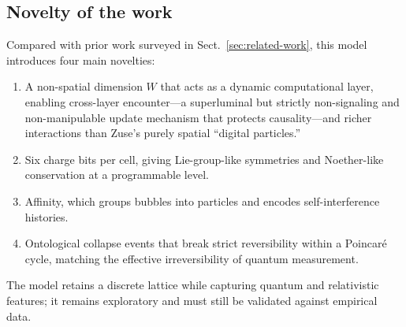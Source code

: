 \documentclass[a4paper]{article}
\begin{document}
\subsection{Novelty of the work}
Compared with prior work surveyed in Sect.~\ref{sec:related-work}, this model introduces four main novelties:
\begin{enumerate}
\item A non-spatial dimension $W$ that acts as a dynamic computational layer, enabling cross-layer encounter---a superluminal but strictly non-signaling and non-manipulable update mechanism that protects causality---and richer interactions than Zuse's purely spatial ``digital particles.''
\item Six charge bits per cell, giving Lie-group-like symmetries and Noether-like conservation at a programmable level.
\item Affinity, which groups bubbles into particles and encodes self-interference histories.
\item Ontological collapse events that break strict reversibility within a Poincar\'{e} cycle, matching the effective irreversibility of quantum measurement.
\end{enumerate}
The model retains a discrete lattice while capturing quantum and relativistic features; it remains exploratory and must still be validated against empirical data.
\end{document}
